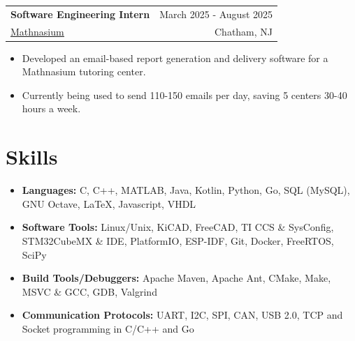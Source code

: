 \documentclass{article}
\begin{document}
    
    \raggedright\begin{tabular}{lr}
        \parbox[l]{3.65in}{\bf{\large{Software Engineering Intern}}} &
        \parbox[r]{3.65in}{\raggedleft March 2025 - August 2025} \\
        \parbox[l]{3.65in}{\href{https://www.mathnasium.com/math-centers/chatham}{\underline{Mathnasium}}} &
        \parbox[r]{3.65in}{\raggedleft Chatham, NJ}
    \end{tabular}
    \vspace{-10pt}\begin{itemize} 
        \setlength{\itemsep}{-2pt}
        \item Developed an email-based report generation and delivery software for a Mathnasium tutoring center.
        \item Currently being used to send 110-150 emails per day, saving 5 centers 30-40 hours a week.
    \end{itemize}

\section{Skills} \vspace{4pt}
    \begin{itemize}
        \setlength{\itemsep}{-2pt}
        \item {\bf Languages:} C, C++, MATLAB, Java, Kotlin, Python, Go, SQL (MySQL), GNU Octave, \LaTeX, Javascript, VHDL
		\item {\bf Software Tools:} Linux/Unix, KiCAD, FreeCAD, TI CCS \& SysConfig, STM32CubeMX \& IDE, PlatformIO, ESP-IDF, Git, Docker, FreeRTOS, SciPy
        \item {\bf Build Tools/Debuggers:} Apache Maven, Apache Ant, CMake, Make, MSVC \& GCC, GDB, Valgrind
        \item {\bf Communication Protocols:} UART, I2C, SPI, CAN, USB 2.0, TCP and Socket programming in C/C++ and Go
    \end{itemize}
\end{document}
